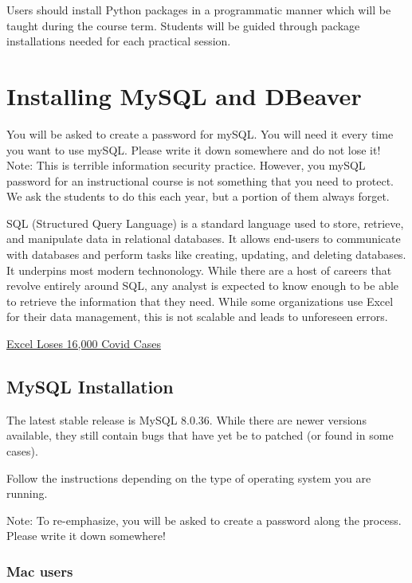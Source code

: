 \documentclass[
]{book}
\begin{document}
Users should install Python packages in a programmatic manner which will be taught during the course term. Students will be guided through package installations needed for each practical session.

\chapter{Installing MySQL and DBeaver}\label{installing-mysql-and-dbeaver}

You will be asked to create a password for mySQL. You will need it every time you want to use mySQL. Please write it down somewhere and do not lose it! Note: This is terrible information security practice. However, you mySQL password for an instructional course is not something that you need to protect. We ask the students to do this each year, but a portion of them always forget.

SQL (Structured Query Language) is a standard language used to store, retrieve, and manipulate data in relational databases. It allows end-users to communicate with databases and perform tasks like creating, updating, and deleting databases. It underpins most modern technonology. While there are a host of careers that revolve entirely around SQL, any analyst is expected to know enough to be able to retrieve the information that they need. While some organizations use Excel for their data management, this is not scalable and leads to unforeseen errors.

\href{https://www.bbc.co.uk/news/technology-54423988}{Excel Loses 16,000 Covid Cases}

\section{MySQL Installation}\label{installing-sql}

The latest stable release is MySQL 8.0.36. While there are newer versions available, they still contain bugs that have yet be to patched (or found in some cases).

Follow the instructions depending on the type of operating system you are running.

Note: To re-emphasize, you will be asked to create a password along the process. Please write it down somewhere!

\subsection{Mac users}\label{mac-users-1}
\end{document}
